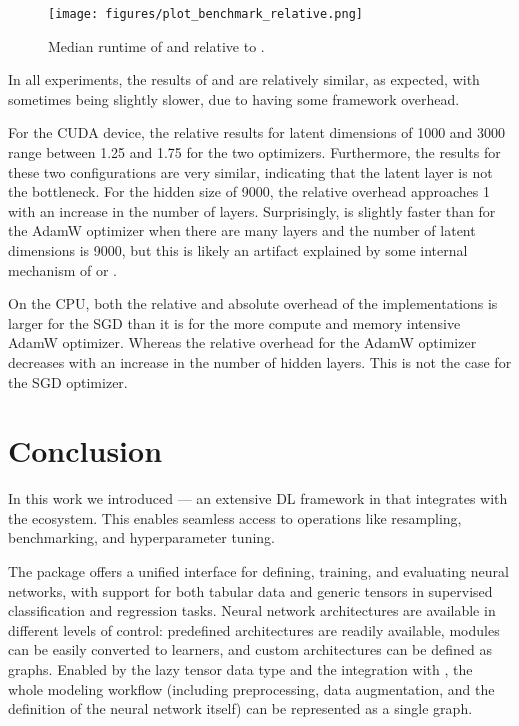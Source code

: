\documentclass[article]{jss}
\theoremstyle{definition}
\begin{document}
\begin{figure}[h]
    \centering
    \texttt{[image: figures/plot\_benchmark\_relative.png]}
    \caption{Median runtime of \mlrttorch{}  and \torch{} relative to \pytorch{}.}
    \label{fig:optimizer-benchmark-relative}
\end{figure}



In all experiments, the results of \torch{} and \mlrttorch{} are relatively similar, as expected, with \mlrttorch{} sometimes being slightly slower, due to having some framework overhead.

For the CUDA device, the relative results for latent dimensions of 1000 and 3000 range between 1.25 and 1.75 for the two optimizers.
Furthermore, the results for these two configurations are very similar, indicating that the latent layer is not the bottleneck.
For the hidden size of 9000, the relative overhead approaches 1  with an increase in the number of layers.
Surprisingly, \mlrttorch{} is slightly faster than \torch{} for the AdamW optimizer when there are many layers and the number of latent dimensions is 9000, but this is likely an artifact explained by some internal mechanism of \torch{} or \libtorch{}.

On the CPU, both the relative and absolute overhead of the \rlang{} implementations is larger for the SGD than it is for the more compute and memory intensive AdamW optimizer.
Whereas the relative overhead for the AdamW optimizer decreases with an increase in the number of hidden layers. This is not the case for the SGD optimizer.

\section{Conclusion}\label{sec:conclusion}

In this work we introduced  --- an extensive DL framework in \rlang{} that integrates with the \mlrt{} ecosystem.
This enables seamless access to operations like resampling, benchmarking, and hyperparameter tuning.

The package offers a unified interface for defining, training, and evaluating neural networks, with support for both tabular data and generic tensors in supervised classification and regression tasks.
Neural network architectures are available in different levels of control: predefined architectures are readily available, \torch{} modules can be easily converted to \mlrttorch{} learners, and custom architectures can be defined as graphs.
Enabled by the lazy tensor data type and the integration with \mlrtpipelines{}, the whole modeling workflow (including preprocessing, data augmentation, and the definition of the neural network itself) can be represented as a single graph.
\end{document}
